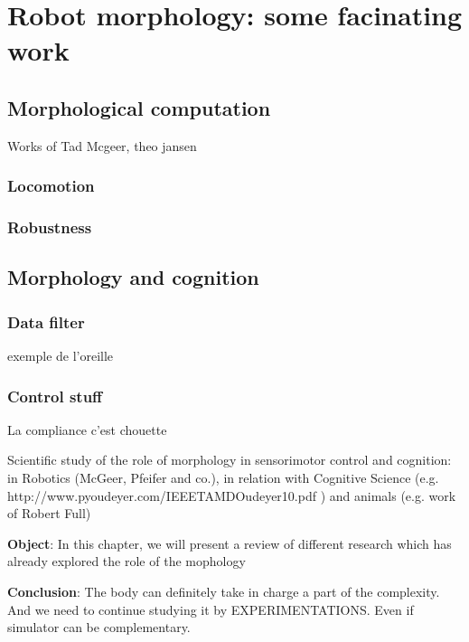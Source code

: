 


\chapter{Robot morphology: some facinating work} %

\section{Morphological computation} %

Works of Tad Mcgeer, theo jansen

\subsection{Locomotion} %

\subsection{Robustness} %


\section{Morphology and cognition} %

\subsection{Data filter} %

exemple de l'oreille

\subsection{Control stuff} %

La compliance c'est chouette


Scientific study of the role of morphology in sensorimotor control and cognition: in Robotics (McGeer, Pfeifer and co.), in relation with Cognitive Science (e.g. http://www.pyoudeyer.com/IEEETAMDOudeyer10.pdf ) and animals (e.g. work of Robert Full)

\textbf{Object}: In this chapter, we will present a review of different research which has already explored the role of the mophology


\textbf{Conclusion}: The body can definitely take in charge a part of the complexity. And we need to continue studying it by EXPERIMENTATIONS. Even if simulator can be complementary.

